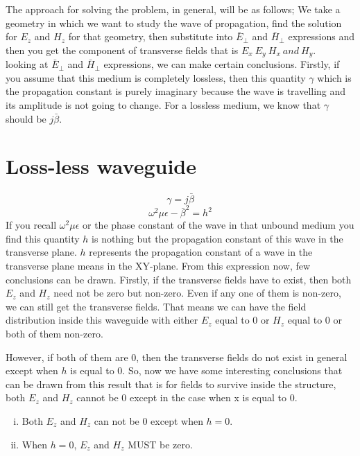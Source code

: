 The approach for solving the problem, in general, will be as follows; We take a geometry in which we want to study the wave of propagation, find the solution for $E_z$ and $H_z$ for that geometry, then substitute into $\bar{E}_\bot$ and $\bar{H}_\bot$ expressions and then you get the component of transverse fields that is $E_x\ E_y\ H_x\ and\ H_y$.\\looking at $\bar{E}_\bot$ and $\bar{H}_\bot$ expressions, we can make certain conclusions. Firstly, if you assume that this medium is completely lossless, then this quantity $\gamma$ which is the propagation constant is purely imaginary because the wave is travelling and its amplitude is not going to change. For a lossless medium, we know that $\gamma$ should be $j\bar{\beta}$.
\section{Loss-less waveguide}
\begin{equation*}
\gamma = j\bar{\beta}
\end{equation*}
\begin{equation*}
\omega^2\mu\epsilon - \bar{\beta}^2 = h^2
\end{equation*}
If you recall $\omega^2\mu\epsilon$ or the phase constant of the wave in that unbound medium you find this quantity $h$ is nothing but the propagation constant of this wave in the transverse plane. $h$ represents the propagation constant of a wave in the transverse plane means in the XY-plane. From this expression now, few conclusions can be drawn. Firstly, if the transverse fields have to exist, then both $E_z$ and $H_z$ need not be zero but non-zero. Even if any one of them is non-zero, we can still get the transverse fields. That means we can have the field distribution inside this waveguide with either $E_z$ equal to 0 or $H_z$ equal to 0 or both of them non-zero.

However, if both of them are 0, then the transverse fields do not exist in general except when $h$ is equal to 0. So, now we have some interesting conclusions that can be drawn from this result that is for fields to survive inside the structure, both $E_z$ and $H_z$ cannot be 0 except in the case when x is equal to 0.
\begin{enumerate}[(i)]
\item Both $E_z$ and $H_z$ can not be 0 except when $h=0$.
\item When $h=0$, $E_z$ and $H_z$ MUST be zero.
\end{enumerate}

